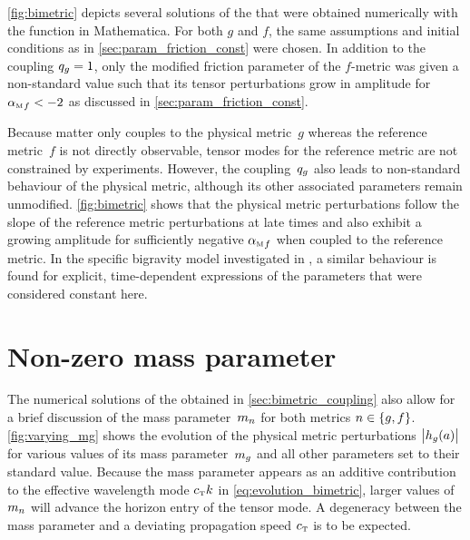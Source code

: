 \autoref{fig:bimetric} depicts several solutions of the  that were obtained numerically with the  function in Mathematica. For both \(g\) and \(f\), the same assumptions and initial conditions as in \autoref{sec:param_friction_const} were chosen. In addition to the coupling \(q_{g}=1\), only the modified friction parameter of the \(f\)-metric was given a non-standard value such that its tensor perturbations grow in amplitude for \({\alpha_{\textnormal{\tiny{M}}}}_{f} < -2\) as discussed in \autoref{sec:param_friction_const}.


Because matter only couples to the physical metric~\(g\) whereas the reference metric~\(f\) is not directly observable, tensor modes for the reference metric are not constrained by experiments. However, the coupling~\(q_{g}\) also leads to non-standard behaviour of the physical metric, although its other associated parameters remain unmodified. \autoref{fig:bimetric} shows that the physical metric perturbations follow the slope of the reference metric perturbations at late times and also exhibit a growing amplitude for sufficiently negative \({\alpha_{\textnormal{\tiny{M}}}}_{f}\) when coupled to the reference metric. In the specific bigravity model investigated in \cite{Amendola2015}, a similar behaviour is found for explicit, time-dependent expressions of the parameters that were considered constant here.


\section{Non-zero mass parameter}

The numerical solutions of the  obtained in \autoref{sec:bimetric_coupling} also allow for a brief discussion of the mass parameter~\(m_{n}\) for both metrics \(n \in \cbr{g,f}\). \autoref{fig:varying_mg} shows the evolution of the physical metric perturbations~\(\abs{h_{g}(a)}\) for various values of its mass parameter~\(m_{g}\) and all other parameters set to their standard value. Because the mass parameter appears as an additive contribution to the effective wavelength mode \({c_{\textnormal{\tiny{T}}}} k\) in \eqref{eq:evolution_bimetric}, larger values of \(m_{n}\) will advance the horizon entry of the tensor mode. A degeneracy between the mass parameter and a deviating propagation speed \({c_{\textnormal{\tiny{T}}}}\) is to be expected.

